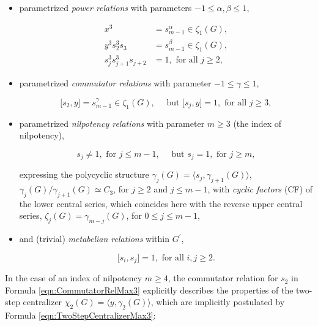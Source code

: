 \documentclass{amsart}
\theoremstyle{definition}
\numberwithin{equation}{section}
\begin{document}
\begin{itemize}
\item
parametrized \textit{power relations} with parameters \(-1\le\alpha,\beta\le 1\),

\begin{equation}
\label{eqn:PowerRelMax3}
\begin{aligned}
x^3                   &= s_{m-1}^\alpha\in\zeta_1(G), \\
y^3s_2^3s_3           &= s_{m-1}^\beta\in\zeta_1(G), \\
s_j^3s_{j+1}^3s_{j+2} &= 1, \text{ for all } j\ge 2,
\end{aligned}
\end{equation}

\item
parametrized \textit{commutator relations} with parameter \(-1\le\gamma\le 1\),

\begin{equation}
\label{eqn:CommutatorRelMax3}
\lbrack s_2,y\rbrack=s_{m-1}^\gamma\in\zeta_1(G), \quad \text{ but } \lbrack s_j,y\rbrack=1, \text{ for all } j\ge 3,
\end{equation}

\item
parametrized \textit{nilpotency relations} with parameter \(m\ge 3\) (the index of nilpotency),

\begin{equation}
\label{eqn:NilpotencyRelMax3}
s_j\ne 1, \text{ for } j\le m-1, \quad \text{ but } s_j=1, \text{ for } j\ge m,
\end{equation}

\noindent
expressing the polycyclic structure
\(\gamma_j(G)=\langle s_j,\gamma_{j+1}(G)\rangle\),
\(\gamma_j(G)/\gamma_{j+1}(G)\simeq C_3\), for \(j\ge 2\) and \(j\le m-1\),
with \textit{cyclic factors} (CF) of the lower central series,
which coincides here with the reverse upper central series, \(\zeta_j(G)=\gamma_{m-j}(G)\), for \(0\le j\le m-1\),

\item
and (trivial) \textit{metabelian relations} within \(G^\prime\),

\begin{equation}
\label{eqn:MetabelianRelMax3}
\lbrack s_i,s_j\rbrack=1, \text{ for all } i,j\ge 2.
\end{equation}

\end{itemize}


\noindent
In the case of an index of nilpotency \(m\ge 4\), the commutator relation for \(s_2\) in Formula
\eqref{eqn:CommutatorRelMax3}
explicitly describes the properties of the two-step centralizer
\(\chi_2(G)=\langle y,\gamma_2(G)\rangle\),
which are implicitly postulated by Formula
\eqref{eqn:TwoStepCentralizerMax3}:
\end{document}
